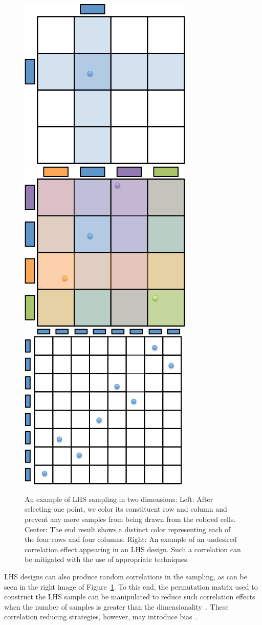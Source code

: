 \begin{figure}[t]
  \centering
  \includegraphics[width=.27\textwidth]{figs/chap3/lhs}\qquad
  \includegraphics[width=.27\textwidth]{figs/chap3/lhs2}\qquad
  \includegraphics[width=.27\textwidth]{figs/chap3/lhs3}
  \caption[Two-dimensional Latin hypercube sampling example]{An example of LHS sampling in
  two dimensions: Left: After selecting one point, we color its constituent row and column
  and prevent any more samples from being drawn from the colored cells.
  Center: The end result shows a distinct color representing each of the four
  rows and four columns. Right: An example of an undesired correlation effect appearing in an LHS design. Such a correlation can be mitigated with the use of appropriate techniques.}
  \label{fig:lhsExample}
\end{figure}

LHS designs can also produce random correlations in the sampling, as can be seen in the right image of Figure~\ref{fig:lhsExample}.
%
To this end, the permutation matrix used to construct the LHS sample can be manipulated to reduce such correlation effects when the number of samples is greater than the dimensionality~\cite{ImanConover1982,Owen1994}.
%
These correlation reducing strategies, however, may introduce bias~\cite{OlssonSandbergDahlblom2003}.

